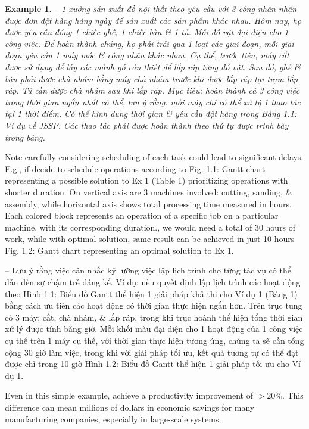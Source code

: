 \documentclass{article}
\newtheorem{example}{Example}
\begin{document}
\begin{itemize}
\begin{example}
        -- 1 xưởng sản xuất đồ nội thất theo yêu cầu với 3 công nhân nhận được đơn đặt hàng hàng ngày để sản xuất các sản phẩm khác nhau. Hôm nay, họ được yêu cầu đóng 1 chiếc ghế, 1 chiếc bàn \& 1 tủ. Mỗi đồ vật đại diện cho 1 công việc. Để hoàn thành chúng, họ phải trải qua 1 loạt các giai đoạn, mỗi giai đoạn yêu cầu 1 máy móc \& công nhân khác nhau. Cụ thể, trước tiên, máy cắt được sử dụng để lấy các mảnh gỗ cần thiết để lắp ráp từng đồ vật. Sau đó, ghế \& bàn phải được chà nhám bằng máy chà nhám trước khi được lắp ráp tại trạm lắp ráp. Tủ cần được chà nhám sau khi lắp ráp. Mục tiêu: hoàn thành cả 3 công việc trong thời gian ngắn nhất có thể, lưu ý rằng: mỗi máy chỉ có thể xử lý 1 thao tác tại 1 thời điểm. Có thể hình dung thời gian \& yêu cầu đặt hàng trong {\sf Bảng 1.1: Ví dụ về JSSP. Các thao tác phải được hoàn thành theo thứ tự được trình bày trong bảng}.
    \end{example}
    Note carefully considering scheduling of each task could lead to significant delays. E.g., if decide to schedule operations according to {\sf Fig. 1.1: Gantt chart representing a possible solution to Ex 1 (Table 1) prioritizing operations with shorter duration. On vertical axis are 3 machines involved: cutting, sanding, \& assembly, while horizontal axis shows total processing time measured in hours. Each colored block represents an operation of a specific job on a particular machine, with its corresponding duration.}, we would need a total of 30 hours of work, while with optimal solution, same result can be achieved in just 10 hours {\sf Fig. 1.2: Gantt chart representing an optimal solution to Ex 1.}

    -- Lưu ý rằng việc cân nhắc kỹ lưỡng việc lập lịch trình cho từng tác vụ có thể dẫn đến sự chậm trễ đáng kể. Ví dụ: nếu quyết định lập lịch trình các hoạt động theo {\sf Hình 1.1: Biểu đồ Gantt thể hiện 1 giải pháp khả thi cho Ví dụ 1 (Bảng 1) bằng cách ưu tiên các hoạt động có thời gian thực hiện ngắn hơn. Trên trục tung có 3 máy: cắt, chà nhám, \& lắp ráp, trong khi trục hoành thể hiện tổng thời gian xử lý được tính bằng giờ. Mỗi khối màu đại diện cho 1 hoạt động của 1 công việc cụ thể trên 1 máy cụ thể, với thời gian thực hiện tương ứng}, chúng ta sẽ cần tổng cộng 30 giờ làm việc, trong khi với giải pháp tối ưu, kết quả tương tự có thể đạt được chỉ trong 10 giờ {\sf Hình 1.2: Biểu đồ Gantt thể hiện 1 giải pháp tối ưu cho Ví dụ 1.}

    Even in this simple example, achieve a productivity improvement of $> 20\%$. This difference can mean millions of dollars in economic savings for many manufacturing companies, especially in large-scale systems.


\end{itemize}
\end{document}

